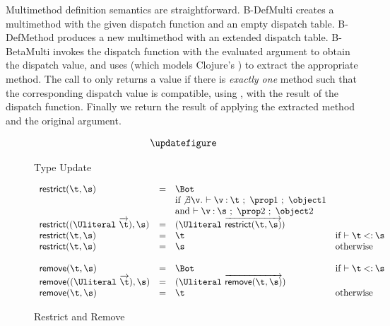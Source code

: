 Multimethod definition semantics are straightforward.
B-DefMulti creates a multimethod with the given dispatch function and an empty dispatch table.
B-DefMethod produces a new multimethod with an extended dispatch table.
B-BetaMulti invokes the dispatch function with the evaluated argument to obtain the dispatch value,
and uses \getmethodliteral{} (which models Clojure's ) 
to extract the appropriate method. The call to \getmethodliteral{} only returns a value
if there is \emph{exactly one} method such that the corresponding dispatch value
is compatible, using \isaopsemliteral{}, with the result of the dispatch function.
Finally we return the result of applying the extracted method and the original argument.

\begin{figure*}
  $$
\begin{array}{lllll}
\updatefigure
\end{array}
$$
\caption{Type Update}
\label{main:figure:update}
\end{figure*}

\begin{figure}
  $$
\begin{array}{lllll}
  \restrictremovefigure{}
\end{array}
  $$
  \caption{Restrict and Remove}
  \label{main:figure:restrictremove}
\end{figure}
